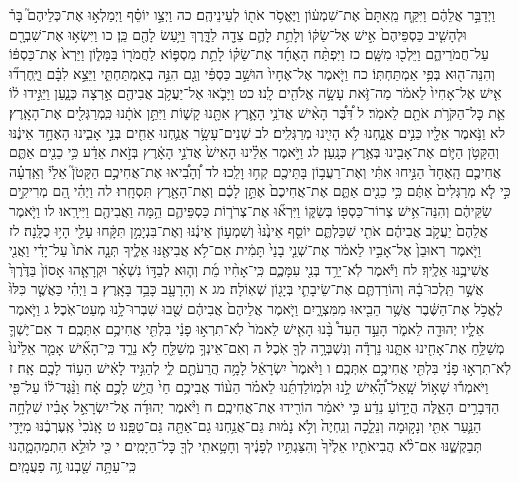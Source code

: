 \documentclass[twoside, openany, parskip=half, 11pt]{book}
\begin{document}
וַיְדַבֵּ֣ר אֲלֵהֶ֔ם וַיִּקַּ֤ח מֵֽאִתָּם֙ אֶת־שִׁמְע֔וֹן וַיֶּאֱסֹ֥ר אֹת֖וֹ לְעֵינֵיהֶֽם׃ כה וַיְצַ֣ו יוֹסֵ֗ף וַיְמַלְא֣וּ אֶת־כְּלֵיהֶם֮ בָּר֒ וּלְהָשִׁ֤יב כַּסְפֵּיהֶם֙ אִ֣ישׁ אֶל־שַׂקּ֔וֹ וְלָתֵ֥ת לָהֶ֛ם צֵדָ֖ה לַדָּ֑רֶךְ וַיַּ֥עַשׂ לָהֶ֖ם כֵּֽן׃ כו וַיִּשְׂא֥וּ אֶת־שִׁבְרָ֖ם עַל־חֲמֹרֵיהֶ֑ם וַיֵּלְכ֖וּ מִשָּֽׁם׃ כז וַיִּפְתַּ֨ח הָאֶחָ֜ד אֶת־שַׂקּ֗וֹ לָתֵ֥ת מִסְפּ֛וֹא לַחֲמֹר֖וֹ בַּמָּל֑וֹן וַיַּרְא֙ אֶת־כַּסְפּ֔וֹ וְהִנֵּה־ה֖וּא בְּפִ֥י אַמְתַּחְתּֽוֹ׃ כח וַיֹּ֤אמֶר אֶל־אֶחָיו֙ הוּשַׁ֣ב כַּסְפִּ֔י וְגַ֖ם הִנֵּ֣ה בְאַמְתַּחְתִּ֑י וַיֵּצֵ֣א לִבָּ֗ם וַיֶּֽחֶרְד֞וּ אִ֤ישׁ אֶל־אָחִיו֙ לֵאמֹ֔ר מַה־זֹּ֛את עָשָׂ֥ה אֱלֹהִ֖ים לָֽנוּ׃ כט וַיָּבֹ֛אוּ אֶל־יַעֲקֹ֥ב אֲבִיהֶ֖ם אַ֣רְצָה כְּנָ֑עַן וַיַּגִּ֣ידוּ ל֔וֹ אֵ֛ת כׇּל־הַקֹּרֹ֥ת אֹתָ֖ם לֵאמֹֽר׃ ל דִּ֠בֶּ֠ר הָאִ֨ישׁ אֲדֹנֵ֥י הָאָ֛רֶץ אִתָּ֖נוּ קָשׁ֑וֹת וַיִּתֵּ֣ן אֹתָ֔נוּ כִּֽמְרַגְּלִ֖ים אֶת־הָאָֽרֶץ׃ לא וַנֹּ֥אמֶר אֵלָ֖יו כֵּנִ֣ים אֲנָ֑חְנוּ לֹ֥א הָיִ֖ינוּ מְרַגְּלִֽים׃ לב שְׁנֵים־עָשָׂ֥ר אֲנַ֛חְנוּ אַחִ֖ים בְּנֵ֣י אָבִ֑ינוּ הָאֶחָ֣ד אֵינֶ֔נּוּ וְהַקָּטֹ֥ן הַיּ֛וֹם אֶת־אָבִ֖ינוּ בְּאֶ֥רֶץ כְּנָֽעַן׃ לג וַיֹּ֣אמֶר אֵלֵ֗ינוּ הָאִישׁ֙ אֲדֹנֵ֣י הָאָ֔רֶץ בְּזֹ֣את אֵדַ֔ע כִּ֥י כֵנִ֖ים אַתֶּ֑ם אֲחִיכֶ֤ם הָֽאֶחָד֙ הַנִּ֣יחוּ אִתִּ֔י וְאֶת־רַעֲב֥וֹן בָּתֵּיכֶ֖ם קְח֥וּ וָלֵֽכוּ׃ לד וְ֠הָבִ֠יאוּ אֶת־אֲחִיכֶ֣ם הַקָּטֹן֮ אֵלַי֒ וְאֵֽדְעָ֗ה כִּ֣י לֹ֤א מְרַגְּלִים֙ אַתֶּ֔ם כִּ֥י כֵנִ֖ים אַתֶּ֑ם אֶת־אֲחִיכֶם֙ אֶתֵּ֣ן לָכֶ֔ם וְאֶת־הָאָ֖רֶץ תִּסְחָֽרוּ׃ לה וַיְהִ֗י הֵ֚ם מְרִיקִ֣ים שַׂקֵּיהֶ֔ם וְהִנֵּה־אִ֥ישׁ צְרוֹר־כַּסְפּ֖וֹ בְּשַׂקּ֑וֹ וַיִּרְא֞וּ אֶת־צְרֹר֧וֹת כַּסְפֵּיהֶ֛ם הֵ֥מָּה וַאֲבִיהֶ֖ם וַיִּירָֽאוּ׃ לו וַיֹּ֤אמֶר אֲלֵהֶם֙ יַעֲקֹ֣ב אֲבִיהֶ֔ם אֹתִ֖י שִׁכַּלְתֶּ֑ם יוֹסֵ֤ף אֵינֶ֙נּוּ֙ וְשִׁמְע֣וֹן אֵינֶ֔נּוּ וְאֶת־בִּנְיָמִ֣ן תִּקָּ֔חוּ עָלַ֖י הָי֥וּ כֻלָּֽנָה׃ לז וַיֹּ֤אמֶר רְאוּבֵן֙ אֶל־אָבִ֣יו לֵאמֹ֔ר אֶת־שְׁנֵ֤י בָנַי֙ תָּמִ֔ית אִם־לֹ֥א אֲבִיאֶ֖נּוּ אֵלֶ֑יךָ תְּנָ֤ה אֹתוֹ֙ עַל־יָדִ֔י וַאֲנִ֖י אֲשִׁיבֶ֥נּוּ אֵלֶֽיךָ׃ לח וַיֹּ֕אמֶר לֹֽא־יֵרֵ֥ד בְּנִ֖י עִמָּכֶ֑ם כִּֽי־אָחִ֨יו מֵ֜ת וְה֧וּא לְבַדּ֣וֹ נִשְׁאָ֗ר וּקְרָאָ֤הוּ אָסוֹן֙ בַּדֶּ֙רֶךְ֙ אֲשֶׁ֣ר תֵּֽלְכוּ־בָ֔הּ וְהוֹרַדְתֶּ֧ם אֶת־שֵׂיבָתִ֛י בְּיָג֖וֹן שְׁאֽוֹלָה׃ מג א וְהָרָעָ֖ב כָּבֵ֥ד בָּאָֽרֶץ׃ ב וַיְהִ֗י כַּאֲשֶׁ֤ר כִּלּוּ֙ לֶאֱכֹ֣ל אֶת־הַשֶּׁ֔בֶר אֲשֶׁ֥ר הֵבִ֖יאוּ מִמִּצְרָ֑יִם וַיֹּ֤אמֶר אֲלֵיהֶם֙ אֲבִיהֶ֔ם שֻׁ֖בוּ שִׁבְרוּ־לָ֥נוּ מְעַט־אֹֽכֶל׃ ג וַיֹּ֧אמֶר אֵלָ֛יו יְהוּדָ֖ה לֵאמֹ֑ר הָעֵ֣ד הֵעִד֩ בָּ֨נוּ הָאִ֤ישׁ לֵאמֹר֙ לֹֽא־תִרְא֣וּ פָנַ֔י בִּלְתִּ֖י אֲחִיכֶ֥ם אִתְּכֶֽם׃ ד אִם־יֶשְׁךָ֛ מְשַׁלֵּ֥חַ אֶת־אָחִ֖ינוּ אִתָּ֑נוּ נֵרְדָ֕ה וְנִשְׁבְּרָ֥ה לְךָ֖ אֹֽכֶל׃ ה וְאִם־אֵינְךָ֥ מְשַׁלֵּ֖חַ לֹ֣א נֵרֵ֑ד כִּֽי־הָאִ֞ישׁ אָמַ֤ר אֵלֵ֙ינוּ֙ לֹֽא־תִרְא֣וּ פָנַ֔י בִּלְתִּ֖י אֲחִיכֶ֥ם אִתְּכֶֽם׃ ו וַיֹּ֙אמֶר֙ יִשְׂרָאֵ֔ל לָמָ֥ה הֲרֵעֹתֶ֖ם לִ֑י לְהַגִּ֣יד לָאִ֔ישׁ הַע֥וֹד לָכֶ֖ם אָֽח׃ ז וַיֹּאמְר֡וּ שָׁא֣וֹל שָֽׁאַל־הָ֠אִ֠ישׁ לָ֣נוּ וּלְמֽוֹלַדְתֵּ֜נוּ לֵאמֹ֗ר הַע֨וֹד אֲבִיכֶ֥ם חַי֙ הֲיֵ֣שׁ לָכֶ֣ם אָ֔ח וַנַּ֨גֶּד־ל֔וֹ עַל־פִּ֖י הַדְּבָרִ֣ים הָאֵ֑לֶּה הֲיָד֣וֹעַ נֵדַ֔ע כִּ֣י יֹאמַ֔ר הוֹרִ֖ידוּ אֶת־אֲחִיכֶֽם׃ ח וַיֹּ֨אמֶר יְהוּדָ֜ה אֶל־יִשְׂרָאֵ֣ל אָבִ֗יו שִׁלְחָ֥ה הַנַּ֛עַר אִתִּ֖י וְנָק֣וּמָה וְנֵלֵ֑כָה וְנִֽחְיֶה֙ וְלֹ֣א נָמ֔וּת גַּם־אֲנַ֥חְנוּ גַם־אַתָּ֖ה גַּם־טַפֵּֽנוּ׃ ט אָֽנֹכִי֙ אֶֽעֶרְבֶ֔נּוּ מִיָּדִ֖י תְּבַקְשֶׁ֑נּוּ אִם־לֹ֨א הֲבִיאֹתִ֤יו אֵלֶ֙יךָ֙ וְהִצַּגְתִּ֣יו לְפָנֶ֔יךָ וְחָטָ֥אתִֽי לְךָ֖ כׇּל־הַיָּמִֽים׃ י כִּ֖י לוּלֵ֣א הִתְמַהְמָ֑הְנוּ כִּֽי־עַתָּ֥ה שַׁ֖בְנוּ זֶ֥ה פַעֲמָֽיִם׃ 
\end{document}
